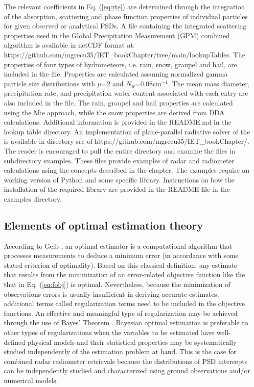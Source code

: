 \documentclass[10pt]{ietbook}
\begin{document}
The relevant coefficients in Eq. (\ref{eq:rte}) are determined through the integration of the absorption, scattering and phase function
properties of individual particles for given observed or analytical PSDs. A file containing the integrated scattering properties used in 
the Global Precipitation Measurement (GPM) combined algorithm \cite{grecu2016} is available in netCDF format at:\\
https://github.com/mgrecu35/IET\_bookChapter/tree/main/lookupTables.
The properties of four types of hydrometeors, i.e. rain, snow, graupel and hail, are included in the file. Properties are calculated assuming
normalized gamma particle size distributions with $\mu$=2 and $N_w$=0.08cm$^{-4}$.  The mean mass diameter, precipitation rate,
and precipitation water content associated with each entry are also included in the file. The rain, graupel and hail properties are calculated using
the Mie approach, while the snow properties are derived from DDA calculations. Additional information is provided in the README.md in the lookup table
directory. An implementation of plane-parallel radiative solver of the \cite{kummerow1993} is available in directory src of 
https://github.com/mgrecu35/IET\_bookChapter/.  The reader is encouraged to pull the entire directory and examine the files in subdirectory examples.
These files provide examples of radar and radiometer calculations using the concepts described in the chapter.  The examples require an working
version of Python and some specific library.  Instructions on how the installation of the required library are provided in the README file
in the examples directory.

\subsection{Elements of optimal estimation theory}

According to Gelb \cite{gelb1974}, an optimal estimator is a computational algorithm that processes measurements to deduce a minimum error (in accordance with some
stated criterion of optimality). Based on this classical definition, any estimate that results from the minimization of an error-related objective function like the
that in Eq. (\ref{eq:fobj}) is optimal. Nevertheless, because the minimization of observations errors is usually insufficient in deriving accurate estimates, additional
terms called regularization terms \cite{doicu2010} need to be included in the objective functions.  An effective and meaningful type of regularization may 
be achieved through the use of Bayes' Theorem \cite{maahn2020}.  Bayesian optimal estimation is preferable to other types of regularizations when the variables
to be estimated have well-defined physical models and their statistical properties may be systematically studied independently of the estimation problem at hand.
This is the case for combined radar radiometer retrievals because the distributions of PSD intercepts can be independently studied and characterized using
ground observations and/or numerical models.
\end{document}
